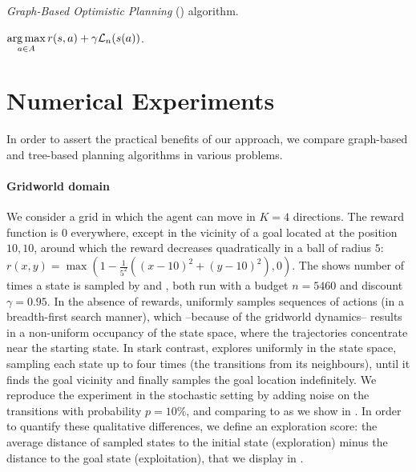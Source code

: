 \documentclass[runningheads]{llncs}
\begin{document}
\begin{algorithm}[ht]
	\caption{\emph{Graph-Based Optimistic Planning} (\GBOP) algorithm.}
	\label{alg:gbop}
	\DontPrintSemicolon
	\Return $\displaystyle\operatorname*{arg\,max}_{a\in A} r(s,a) + \gamma \mathcal{L}_n(s(a))$. 
\end{algorithm}

\section{Numerical Experiments}
\label{sec:experiments}

In order to assert the practical benefits of our approach, we compare graph-based and tree-based planning algorithms in various problems.

\paragraph{Gridworld domain}
We consider a grid in which the agent can move in $K=4$ directions. The reward function is $0$ everywhere, except in the vicinity of a goal located at the position $10, 10$, around which the reward decreases quadratically in a ball of radius $5$: $r(x, y) = \max(1 - \frac{1}{5^2}((x-10)^2 + (y-10)^2), 0)$. The  shows number of times a state is sampled by \OPD and \GBOPD, both run with a budget $n = 5460$ and discount $\gamma=0.95$. In the absence of rewards, \OPD uniformly samples sequences of actions (in a breadth-first search manner), which --because of the gridworld dynamics-- results in a non-uniform occupancy of the state space, where the trajectories concentrate near the starting state. In stark contrast, \GBOPD explores uniformly in the state space, sampling each state up to four times (the transitions from its neighbours), until it finds the goal vicinity and finally samples the goal location indefinitely. We reproduce the experiment in the stochastic setting by adding noise on the transitions with probability $p=10\%$, and comparing \GBOP to \MDPGapE as we show in . In order to quantify these qualitative differences, we define an exploration score: the average distance of sampled states to the initial state (exploration) minus the distance to the goal state (exploitation), that we display in .
\end{document}
